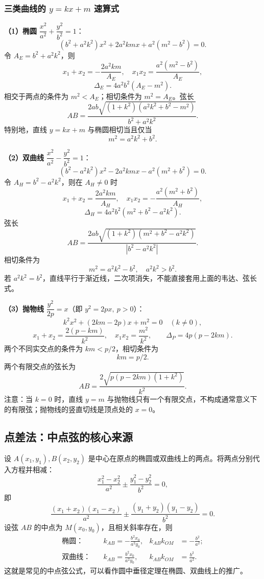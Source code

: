 \documentclass[UTF8,zihao=-4,a4paper]{ctexart}
\newcommand{\abs}[1]{\left|#1\right|}
\begin{document}
\subsubsection*{三类曲线的 $y=kx+m$ 速算式}

\textbf{（1）椭圆} $\dfrac{x^2}{a^2}+\dfrac{y^2}{b^2}=1$：
\[
(b^2+a^2k^2)x^2+2a^2kmx+a^2(m^2-b^2)=0.
\]
令 $A_E=b^2+a^2k^2$，则
\[
\boxed{x_1+x_2=-\frac{2a^2km}{A_E},\quad
x_1x_2=\frac{a^2(m^2-b^2)}{A_E}},
\]
\[
\boxed{\Delta_E=4a^2b^2(A_E-m^2)}.
\]
相交于两点的条件为 $m^2<A_E$；相切条件为 $m^2=A_E$。弦长
\[
\boxed{AB=\frac{2ab\sqrt{(1+k^2)(a^2k^2+b^2-m^2)}}{b^2+a^2k^2}}.
\]
特别地，直线 $y=kx+m$ 与椭圆相切当且仅当
\[
\boxed{m^2=a^2k^2+b^2}.
\]

\textbf{（2）双曲线} $\dfrac{x^2}{a^2}-\dfrac{y^2}{b^2}=1$：
\[
(b^2-a^2k^2)x^2-2a^2kmx-a^2(m^2+b^2)=0.
\]
令 $A_H=b^2-a^2k^2$，则在 $A_H\ne0$ 时
\[
\boxed{x_1+x_2=\frac{2a^2km}{A_H},\quad
x_1x_2=-\frac{a^2(m^2+b^2)}{A_H}},
\]
\[
\boxed{\Delta_H=4a^2b^2(m^2+b^2-a^2k^2)}.
\]
弦长
\[
\boxed{AB=\frac{2ab\sqrt{(1+k^2)(m^2+b^2-a^2k^2)}}{\abs{b^2-a^2k^2}}}.
\]
相切条件为
\[
\boxed{m^2=a^2k^2-b^2,\quad a^2k^2>b^2}.
\]
若 $a^2k^2=b^2$，直线平行于渐近线，二次项消失，不能直接套用上面的韦达、弦长式。

\textbf{（3）抛物线} $\dfrac{y^2}{2p}=x$（即 $y^2=2px,\ p>0$）：
\[
k^2x^2+(2km-2p)x+m^2=0\quad(k\ne0),
\]
\[
\boxed{x_1+x_2=\frac{2(p-km)}{k^2},\quad x_1x_2=\frac{m^2}{k^2}},
\qquad
\boxed{\Delta_P=4p(p-2km)}.
\]
两个不同实交点的条件为 $km<p/2$，相切条件为
\[
\boxed{km=p/2}.
\]
两个有限交点的弦长为
\[
\boxed{AB=\frac{2\sqrt{p(p-2km)(1+k^2)}}{k^2}}.
\]
注意：当 $k=0$ 时，直线 $y=m$ 与抛物线只有一个有限交点，不构成通常意义下的有限弦；抛物线的竖直切线是顶点处的 $x=0$。

\subsection{点差法：中点弦的核心来源}

设 $A(x_1,y_1),B(x_2,y_2)$ 是中心在原点的椭圆或双曲线上的两点。将两点分别代入方程并相减：
\[
\frac{x_1^2-x_2^2}{a^2}\pm
\frac{y_1^2-y_2^2}{b^2}=0,
\]
即
\[
\frac{(x_1+x_2)(x_1-x_2)}{a^2}
\pm\frac{(y_1+y_2)(y_1-y_2)}{b^2}=0.
\]
设弦 $AB$ 的中点为 $M(x_0,y_0)$，且相关斜率存在，则
\[
\boxed{\begin{aligned}
\text{椭圆：}\quad&k_{AB}=-\frac{b^2x_0}{a^2y_0},&
k_{AB}k_{OM}&=-\frac{b^2}{a^2};\\[0.3em]
\text{双曲线：}\quad&k_{AB}=\frac{b^2x_0}{a^2y_0},&
k_{AB}k_{OM}&=\frac{b^2}{a^2}.
\end{aligned}}
\]
这就是常见的中点弦公式，可以看作圆中垂径定理在椭圆、双曲线上的推广。
\end{document}
